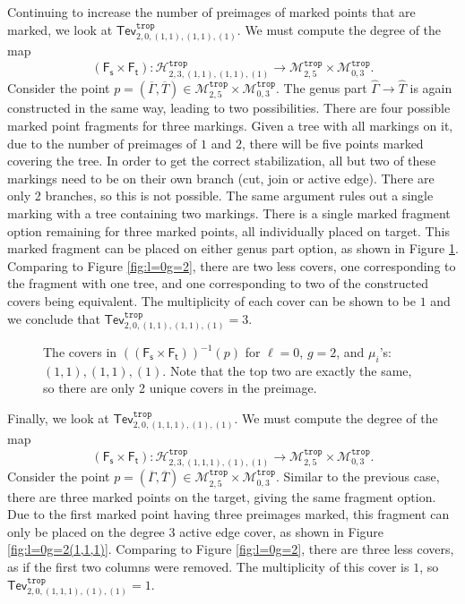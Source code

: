 \documentclass[11pt,reqno]{amsart}
\newcommand{\inputTikZ}[2]{%
     \resizebox{#1}{!}{}}
\theoremstyle{definition}
\newcommand\trop{{\mathtt{trop}}}
\newcommand\Mgn[1]{\mathcal M_{#1}}
\newcommand\Hur[1]{\mathcal H_{#1}}
\newcommand{\Ft}{\mathsf{F_t}}
\newcommand{\Fs}{\mathsf{F_s}}
\newcommand{\gGamma}{\widehat{\Gamma}}
\newcommand{\gT}{\widehat{T}}
\newcommand{\Tev}{{\mathsf{Tev}}}
\begin{document}
Continuing to increase the number of preimages of marked points that are marked, we look at $\Tev^\trop_{2,0,(1,1),(1,1),(1)}$. We must compute the degree of the map 
\[(\Fs\times\Ft):\Hur{2,3,(1,1),(1,1),(1)}^\trop \to \Mgn{2,5}^\trop \times \Mgn{0,3}^\trop.\]
Consider the point $p=(\overline{\Gamma},\overline{T})\in\Mgn{2,5}^\trop\times\Mgn{0,3}^\trop$. The genus part $\gGamma\to\gT$ is again constructed in the same way, leading to two possibilities. There are four possible marked point fragments for three markings. Given a tree with all markings on it, due to the number of preimages of $1$ and $2$, there will be five points marked covering the tree. In order to get the correct stabilization, all but two of these markings need to be on their own branch (cut, join or active edge). There are only 2 branches, so this is not possible. The same argument rules out a single marking with a tree containing two markings.
There is a single marked fragment option remaining for three marked points, all individually placed on target. This marked fragment can be placed on either genus part option, as shown in Figure \ref{fig:l=0g=2(1,1)(1,1)}. Comparing to Figure \ref{fig:l=0g=2}, there are two less covers, one corresponding to the fragment with one tree, and one corresponding to two of the constructed covers being equivalent. The multiplicity of each cover can be shown to be $1$ and we conclude that $\Tev^\trop_{2,0,(1,1),(1,1),(1)}=3$.

        \begin{figure}[tb]
        \centering
        \inputTikZ{.6\textwidth}{Figures/l=0g=2_1,1__1,1_}
        \caption{The covers in $((\Fs\times\Ft))^{-1}(p)$ for $\ell=0$, $g=2$, and $\mu_i$'s: $(1,1),(1,1),(1).$ Note that the top two are exactly the same, so there are only 2 unique covers in the preimage.}
        \label{fig:l=0g=2(1,1)(1,1)}
    \end{figure}

        
Finally, we look at $\Tev^\trop_{2,0,(1,1,1),(1),(1)}$. We must compute the degree of the map 
\[(\Fs\times\Ft):\Hur{2,3,(1,1,1),(1),(1)}^\trop \to \Mgn{2,5}^\trop \times \Mgn{0,3}^\trop.\]
Consider the point $p=(\overline{\Gamma},\overline{T})\in\Mgn{2,5}^\trop\times\Mgn{0,3}^\trop$. Similar to the previous case, there are three marked points on the target, giving the same fragment option. Due to the first marked point having three preimages marked, this fragment can only be placed on the degree $3$ active edge cover, as shown in Figure \ref{fig:l=0g=2(1,1,1)}. Comparing to Figure \ref{fig:l=0g=2}, there are three less covers, as if the first two columns were removed. The multiplicity of this cover is $1$, so $\Tev^\trop_{2,0,(1,1,1),(1),(1)}=1$.
\end{document}
